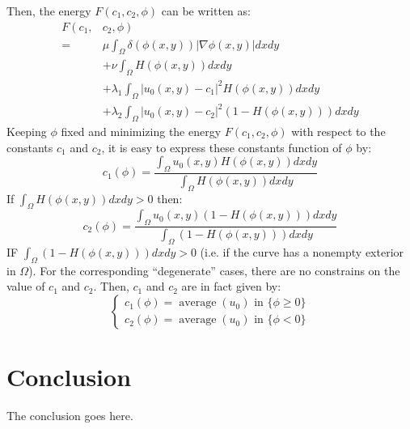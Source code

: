 \documentclass[journal]{IEEEtran}
\begin{document}
Then, the energy $F(c_1,c_2,\phi)$ can be written as:
\begin{equation}
  \begin{aligned}
  F\left(c_{1},\right.&\left.c_{2}, \phi\right) \\
  =& \mu \int_{\Omega} \delta(\phi(x, y))|\nabla \phi(x, y)| d x d y \\
  &+\nu \int_{\Omega} H(\phi(x, y)) d x d y \\
  &+\lambda_{1} \int_{\Omega}\left|u_{0}(x, y)-c_{1}\right|^{2} H(\phi(x, y)) d x d y \\
  &+\lambda_{2} \int_{\Omega}\left|u_{0}(x, y)-c_{2}\right|^{2}(1-H(\phi(x, y))) d x d y
  \end{aligned}
\end{equation}
Keeping $\phi$ fixed and minimizing the energy $F(c_1,c_2,\phi)$ with respect to the constants $c_1$ and $c_2$, it is easy to express these constants function of $\phi$ by:
\begin{equation}
  c_{1}(\phi)=\frac{\int_{\Omega} u_{0}(x, y) H(\phi(x, y)) d x d y}{\int_{\Omega} H(\phi(x, y)) d x d y}
\end{equation} 
If $\int_\Omega H(\phi(x,y))d x d y >0$ then:
\begin{equation}
  c_{2}(\phi)=\frac{\int_{\Omega} u_{0}(x, y)(1-H(\phi(x, y))) d x d y}{\int_{\Omega}(1-H(\phi(x, y))) d x d y}
\end{equation}
IF $\int_\Omega(1-H(\phi(x,y)))d x d y>0$ (i.e. if the curve has a nonempty exterior in $\Omega$). For the corresponding ``degenerate'' cases, there are no constrains on the value of $c_1$ and $c_2$. Then, $c_1$ and $c_2$ are in fact given by:
\begin{equation}
  \left\{\begin{array}{l}
  c_{1}(\phi)=\operatorname{average}\left(u_{0}\right) \text { in }\{\phi \geq 0\} \\
  c_{2}(\phi)=\operatorname{average}\left(u_{0}\right) \text { in }\{\phi<0\}
  \end{array}\right.
\end{equation}
\section{Conclusion}
The conclusion goes here.\cite{han2020survey}

\ifCLASSOPTIONcaptionsoff
  \newpage
\fi



\end{document}

